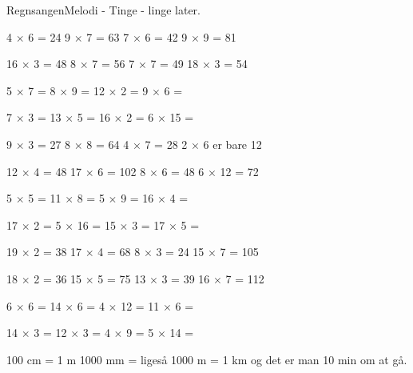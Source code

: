\begin{sang}{Regnsangen}{Melodi - Tinge - linge later.}
\begin{vers}
4 $\times$ 6 = 24
9 $\times$ 7 = 63
7 $\times$ 6 = 42
9 $\times$ 9 = 81
\end{vers}
\begin{vers}
16 $\times$ 3 = 48
8 $\times$ 7 = 56
7 $\times$ 7 = 49
18 $\times$ 3 = 54
\end{vers}
\begin{vers}
5 $\times$ 7 = 
8 $\times$ 9 =
12 $\times$ 2 =
9 $\times$ 6 =
\end{vers}
\begin{vers}
7 $\times$ 3 =
13 $\times$ 5 =
16 $\times$ 2 =
6 $\times$ 15 =
\end{vers}
\begin{vers}
9 $\times$ 3 = 27
8 $\times$ 8 = 64
4 $\times$ 7 = 28
2 $\times$ 6 er bare 12
\end{vers}
\begin{vers}
12 $\times$ 4 = 48
17 $\times$ 6 = 102
8 $\times$ 6 = 48
6 $\times$ 12 = 72
\end{vers}
\begin{vers}
5 $\times$ 5 =
11 $\times$ 8 =
5 $\times$ 9 =
16 $\times$ 4 =
\end{vers}
\begin{vers}
17 $\times$ 2 =
5 $\times$ 16 =
15 $\times$ 3 =
17 $\times$ 5 =
\end{vers}
\begin{vers}
19 $\times$ 2 = 38
17 $\times$ 4 = 68
8 $\times$ 3 = 24
15 $\times$ 7 = 105
\end{vers}
\begin{vers}
18 $\times$ 2 = 36
15 $\times$ 5 = 75
13 $\times$ 3 = 39
16 $\times$ 7 = 112
\end{vers}
\begin{vers}
6 $\times$ 6 =
14 $\times$ 6 =
4 $\times$ 12 =
11 $\times$ 6 =
\end{vers}
\begin{vers}
14 $\times$ 3 =
12 $\times$ 3 =
4 $\times$ 9 =
5 $\times$ 14 =
\end{vers}
\begin{vers}
100 cm = 1 m
1000 mm = ligeså
1000 m = 1 km
og det er man 10 min om at gå.
\end{vers}
\vbox{}\vfill
\vbox{}\vfill
\vbox{}\vfill
\vbox{}\vfill
\laps
\end{sang}

